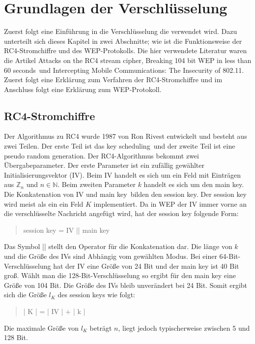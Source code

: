\documentclass[10pt,a4paper]{article}
\begin{document}
\section{Grundlagen der Verschlüsselung}
Zuerst folgt eine Einführung in die Verschlüsselung die verwendet wird. Dazu unterteilt sich dieses Kapitel in zwei Abschnitte; wie ist die Funktionsweise der RC4-Stromchiffre und des WEP-Protokolls. Die hier verwendete Literatur waren die Artikel \glqq Attacks on the RC4 stream cipher\grqq \cite{Kle08}, \glqq Breaking 104 bit WEP in less than 60 seconds\grqq \cite{TWP07}\ und \glqq Intercepting Mobile Communications: The Insecurity of 802.11\grqq \cite{BGW01}. Zuerst folgt eine Erklärung zum Verfahren der RC4-Stromchiffre und im Anschluss folgt eine Erklärung zum WEP-Protokoll.

\subsection{RC4-Stromchiffre}
Der Algorithmus zu RC4 wurde 1987 von Ron Rivest entwickelt und besteht aus zwei Teilen. Der erste Teil ist das \glqq key scheduling\grqq \ und der zweite Teil ist eine \glqq pseudo random generation\grqq. Der RC4-Algorithmus bekommt zwei Übergabeparameter. Der erste Parameter ist ein zufällig gewählter Initialisierungsvektor (IV). Beim IV handelt es sich um ein Feld mit Einträgen aus $\mathbb{Z}_n$ und $n \in \mathbb{N}$. Beim zweiten Parameter $k$ handelt es sich um den \glqq main key\grqq. Die Konkatenation von IV und \glqq main key\grqq \ bilden den session key. Der session key wird meist als ein ein Feld $K$ implementiert. Da in WEP der IV immer vorne an die verschlüsselte Nachricht angefügt wird, hat der session key folgende Form:
\begin{quote}
	session key = IV || main key
\end{quote}
Das Symbol || stellt den Operator für die Konkatenation dar. Die länge von $k$ und die Größe des IVs sind Abhängig vom gewählten Modus. Bei einer 64-Bit-Verschlüsselung hat der IV eine Größe von 24 Bit und der main key ist 40 Bit groß. Wählt man die 128-Bit-Verschlüsselung so ergibt für den main key eine Größe von 104 Bit. Die Größe des IVs bleib unverändert bei 24 Bit. Somit ergibt sich die Größe $l_K$ des session keys wie folgt:
\begin{quote}
	| K | = | IV | + | k |
\end{quote}
Die maximale Größe von $l_K$ beträgt $n$, liegt jedoch typischerweise zwischen 5 und 128 Bit.
\end{document}

